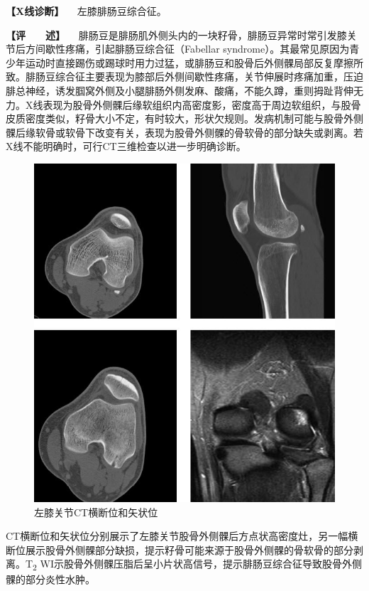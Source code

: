 \textbf{【X线诊断】} 　左膝腓肠豆综合征。

\textbf{【评　　述】}
　腓肠豆是腓肠肌外侧头内的一块籽骨，腓肠豆异常时常引发膝关节后方间歇性疼痛，引起腓肠豆综合征（Fabellar
syndrome）。其最常见原因为青少年运动时直接踢伤或踢球时用力过猛，或腓肠豆和股骨后外侧髁局部反复摩擦所致。腓肠豆综合征主要表现为膝部后外侧间歇性疼痛，关节伸展时疼痛加重，压迫腓总神经，诱发腘窝外侧及小腿腓肠外侧发麻、酸痛，不能久蹲，重则拇趾背伸无力。X线表现为股骨外侧髁后缘软组织内高密度影，密度高于周边软组织，与股骨皮质密度类似，籽骨大小不定，有时较大，形状欠规则。发病机制可能与股骨外侧髁后缘软骨或软骨下改变有关，表现为股骨外侧髁的骨软骨的部分缺失或剥离。若X线不能明确时，可行CT三维检查以进一步明确诊断。

\begin{figure}[!htbp]
 \centering
 \includegraphics{./images/Image00053.jpg}
 \captionsetup{justification=centering}
 \caption{左膝关节CT横断位和矢状位}
 \label{fig2-3-26}
  \end{figure} 

CT横断位和矢状位分别展示了左膝关节股骨外侧髁后方点状高密度灶，另一幅横断位展示股骨外侧髁部分缺损，提示籽骨可能来源于股骨外侧髁的骨软骨的部分剥离。T\textsubscript{2}
WI示股骨外侧髁压脂后呈小片状高信号，提示腓肠豆综合征导致股骨外侧髁的部分炎性水肿。

